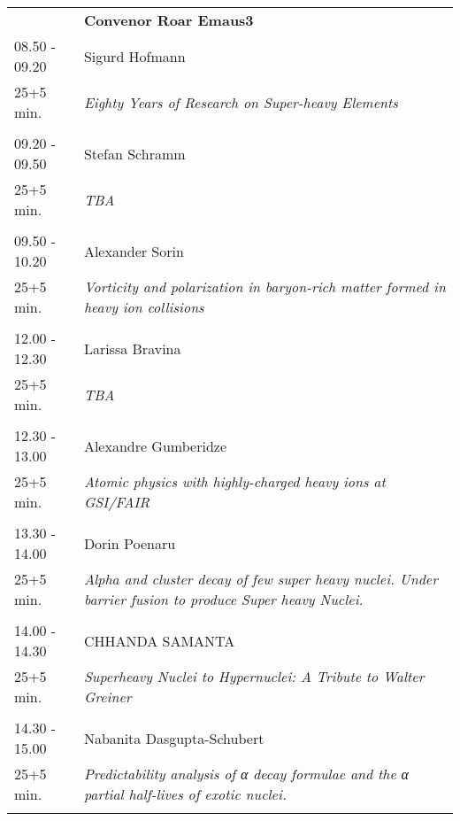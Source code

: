 \begin{longtable}{p{3cm}p{13cm}}
&\hfill {\bf Convenor Roar Emaus3 }\\ 
08.50 - 09.20 & Sigurd Hofmann\\ 
25+5 min. & {\it Eighty Years of Research on Super-heavy Elements}\\ 
 & \\ 
09.20 - 09.50 & Stefan Schramm\\ 
25+5 min. & {\it TBA}\\ 
 & \\ 
09.50 - 10.20 & Alexander Sorin\\ 
25+5 min. & {\it Vorticity and polarization in baryon-rich matter formed in heavy ion collisions}\\ 
 & \\ 
12.00 - 12.30 & Larissa Bravina\\ 
25+5 min. & {\it TBA}\\ 
 & \\ 
12.30 - 13.00 & Alexandre Gumberidze\\ 
25+5 min. & {\it Atomic physics with highly-charged heavy ions at GSI/FAIR}\\ 
 & \\ 
13.30 - 14.00 & Dorin  Poenaru\\ 
25+5 min. & {\it Alpha and cluster decay of few super heavy nuclei. Under barrier fusion to produce Super heavy Nuclei.}\\ 
 & \\ 
14.00 - 14.30 & CHHANDA SAMANTA\\ 
25+5 min. & {\it Superheavy Nuclei to Hypernuclei: A Tribute to Walter Greiner}\\ 
 & \\ 
14.30 - 15.00 & Nabanita Dasgupta-Schubert\\ 
25+5 min. & {\it Predictability analysis of α decay formulae and the α partial half-lives of exotic nuclei.}\\ 
 & \\ 
\end{longtable}


